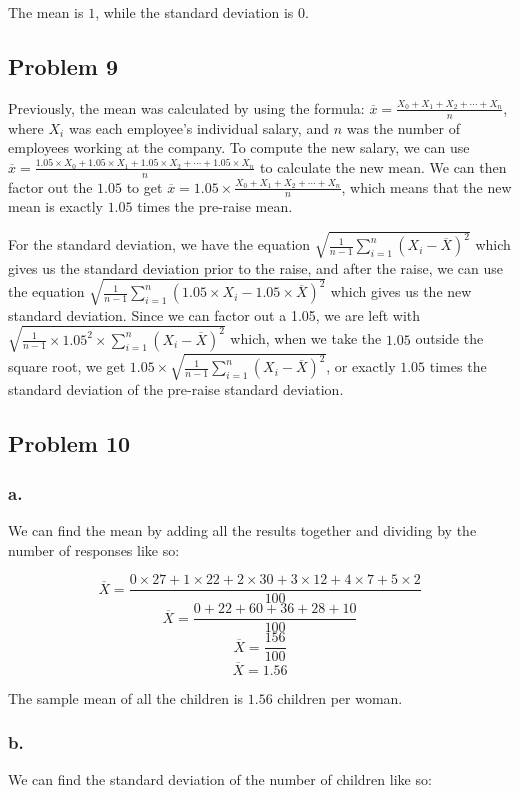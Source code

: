 \documentclass[11pt]{article}
\begin{document}
The mean is $1$, while the standard deviation is $0$. 

\subsection*{Problem 9}
Previously, the mean was calculated by using the formula: 
$\overline{x}=\frac{X_{0}+X_{1}+X_{2}+\cdots+X_{n}}{n}$, where $X_{i}$ was 
each employee's individual salary, and $n$ was the number of employees
working at the company. To compute the new salary, we can use  
$\overline{x}=\frac{1.05 \times X_{0}+1.05 \times X_{1}+1.05 \times X_{2}+\cdots+1.05 \times X_{n}}{n}$
to calculate the new mean. We can then factor out the $1.05$ to get 
$\overline{x}=1.05 \times \frac{X_{0}+X_{1}+X_{2}+\cdots+X_{n}}{n}$, which means that
the new mean is exactly $1.05$ times the pre-raise mean. 

For the standard deviation, we have the equation
$\sqrt{\frac{1}{n-1}\sum\limits_{i=1}^{n}{(X_i-\overline X)}^2}$ which gives us
the standard deviation prior to the raise, and after the raise, we can use the
equation $\sqrt{\frac{1}{n-1}\sum\limits_{i=1}^n{(1.05 \times X_i-1.05 \times \overline X)}^2}$ 
which gives us the new standard deviation. Since we can factor out a 1.05, we
are left with $\sqrt{\frac{1}{n-1} \times 1.05^2 \times \sum\limits_{i=1}^n{(X_i-\overline X)}^2}$ 
which, when we take the $1.05$ outside the square root, we get
$1.05 \times \sqrt{\frac{1}{n-1}\sum\limits_{i=1}^n{(X_i-\overline X)}^2}$, or exactly
$1.05$ times the standard deviation of the pre-raise standard deviation. 

\subsection*{Problem 10}
\subsubsection*{a.}
We can find the mean by adding all the results together and dividing by the
number of responses like so:

\[\overline X = \frac{0 \times 27+1 \times 22+2 \times 30+3 \times 12+4 \times 7+5 \times 2}{100}\]
\[\overline X = \frac{0+22+60+36+28+10}{100}\]
\[\overline X = \frac{156}{100}\]
\[\overline X = 1.56\]

The sample mean of all the children is $1.56$ children per woman.

\subsubsection*{b.}
We can find the standard deviation of the number of children like so:
\end{document}

